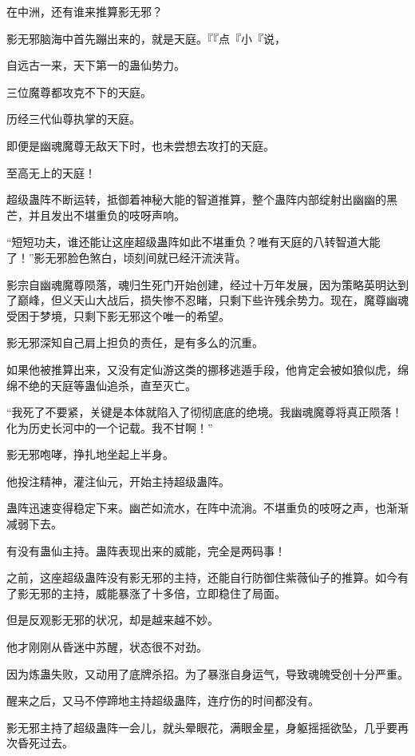 
\begin{this_body}

在中洲，还有谁来推算影无邪？

影无邪脑海中首先蹦出来的，就是天庭。『『点『小『说，

自远古一来，天下第一的蛊仙势力。

三位魔尊都攻克不下的天庭。

历经三代仙尊执掌的天庭。

即便是幽魂魔尊无敌天下时，也未尝想去攻打的天庭。

至高无上的天庭！

超级蛊阵不断运转，抵御着神秘大能的智道推算，整个蛊阵内部绽射出幽幽的黑芒，并且发出不堪重负的吱呀声响。

“短短功夫，谁还能让这座超级蛊阵如此不堪重负？唯有天庭的八转智道大能了！”影无邪脸色煞白，顷刻间就已经汗流浃背。

影宗自幽魂魔尊陨落，魂归生死门开始创建，经过十万年发展，因为策略英明达到了巅峰，但义天山大战后，损失惨不忍睹，只剩下些许残余势力。现在，魔尊幽魂受困于梦境，只剩下影无邪这个唯一的希望。

影无邪深知自己肩上担负的责任，是有多么的沉重。

如果他被推算出来，又没有定仙游这类的挪移逃遁手段，他肯定会被如狼似虎，绵绵不绝的天庭等蛊仙追杀，直至灭亡。

“我死了不要紧，关键是本体就陷入了彻彻底底的绝境。我幽魂魔尊将真正陨落！化为历史长河中的一个记载。我不甘啊！”

影无邪咆哮，挣扎地坐起上半身。

他投注精神，灌注仙元，开始主持超级蛊阵。

蛊阵迅速变得稳定下来。幽芒如流水，在阵中流淌。不堪重负的吱呀之声，也渐渐减弱下去。

有没有蛊仙主持。蛊阵表现出来的威能，完全是两码事！

之前，这座超级蛊阵没有影无邪的主持，还能自行防御住紫薇仙子的推算。如今有了影无邪的主持，威能暴涨了十多倍，立即稳住了局面。

但是反观影无邪的状况，却是越来越不妙。

他才刚刚从昏迷中苏醒，状态很不对劲。

因为炼蛊失败，又动用了底牌杀招。为了暴涨自身运气，导致魂魄受创十分严重。

醒来之后，又马不停蹄地主持超级蛊阵，连疗伤的时间都没有。

影无邪主持了超级蛊阵一会儿，就头晕眼花，满眼金星，身躯摇摇欲坠，几乎要再次昏死过去。


\end{this_body}
